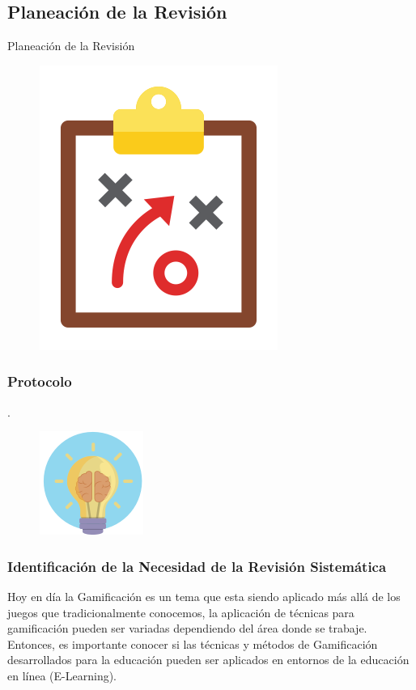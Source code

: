 \documentclass{beamer}
\begin{document}
\subsection{Planeación de la Revisión}
\begin{frame}
\Huge{\centerline{Planeación de la Revisión}}
	\begin{figure}
		\begin{center}
			\includegraphics[scale=.4]{images/2icons/plan.png}
		\end{center}
	\end{figure}
\end{frame}

\begin{frame}
    \frametitle{Protocolo}    .
	\begin{figure}
		\begin{center}
			\includegraphics[scale=0.1]{images/2icons/need.png}
		\end{center}
	\end{figure}
\end{frame}

\begin{frame}
    \frametitle{Identificación de la Necesidad de la Revisión Sistemática}
    Hoy en día la Gamificación es un tema que esta siendo aplicado más allá de los juegos que tradicionalmente conocemos, la aplicación de técnicas para gamificación pueden ser variadas dependiendo del área donde se trabaje. Entonces, es importante conocer si las técnicas y métodos de Gamificación desarrollados para la educación pueden ser aplicados en entornos de la educación en línea (E-Learning).
\end{frame}
\end{document}
